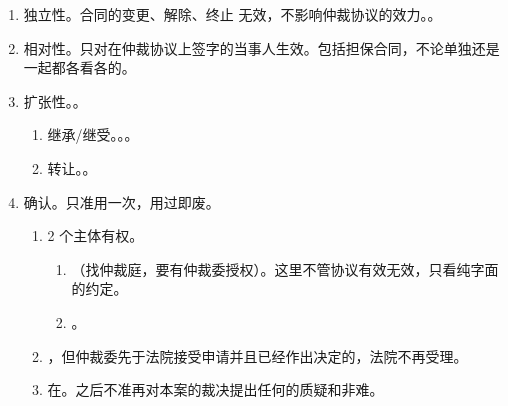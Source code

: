 \begin{enumerate}
\begin{enumerate}
\begin{enumerate}
                  \item 受理后发现，裁定驳回起诉。\sjt 同起诉受理的处理。
                  \item {}。
                \end{enumerate}
          \item 独立性。合同的变更、解除、终止 \hz 无效，不影响仲裁协议的效力。。
          \item 相对性。只对在仲裁协议上签字的当事人生效。包括担保合同，不论单独还是一起都各看各的。
          \item 扩张性。。
                \begin{enumerate}
                  \item 继承/继受。。。
                  \item 转让。。
                \end{enumerate}
          \item 确认。只准用一次，用过即废。
                \begin{enumerate}
                  \item 2 个主体有权。
                        \begin{enumerate}
                          \item {}（找仲裁庭，要有仲裁委授权）。这里不管协议有效无效，只看纯字面的约定。
                          \item {}。
                        \end{enumerate}
                  \item {}，但仲裁委先于法院接受申请并且已经作出决定的，法院不再受理。
                  \item 在。之后不准再对本案的裁决提出任何的质疑和非难。
                \end{enumerate}
        \end{enumerate}
\end{enumerate}

